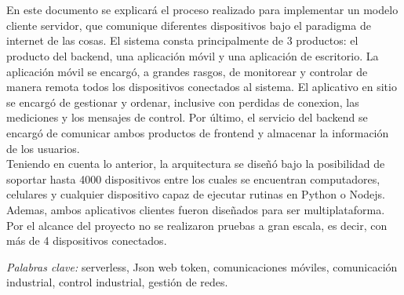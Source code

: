 

\section*{}

En este documento se explicará el proceso realizado para implementar un modelo cliente servidor, que comunique diferentes dispositivos bajo el paradigma de internet de las cosas. El sistema consta principalmente de 3 productos: el producto del backend, una aplicación móvil y una aplicación de escritorio. La aplicación móvil se encargó, a grandes rasgos, de monitorear y controlar de manera remota todos los dispositivos conectados al sistema. El aplicativo en sitio se encargó de gestionar y ordenar, inclusive con perdidas de conexion, las mediciones y los mensajes de control. Por último, el servicio del backend se encargó de comunicar ambos productos de frontend y almacenar la información de los usuarios.
\vspace{0.5cm}\\
Teniendo en cuenta lo anterior, la arquitectura se diseñó bajo la posibilidad de soportar hasta 4000 dispositivos entre los cuales se encuentran computadores, celulares y cualquier dispositivo capaz de ejecutar rutinas en Python o Nodejs. Ademas, ambos aplicativos clientes fueron diseñados para ser multiplataforma. Por el alcance del proyecto no se realizaron pruebas a gran escala, es decir, con más de 4 dispositivos conectados.
\begin{center}
	\textsl{Palabras clave:} serverless, Json web token, comunicaciones móviles, comunicación industrial, control industrial, gestión de redes.
\end{center}

\newpage

\section*{}

